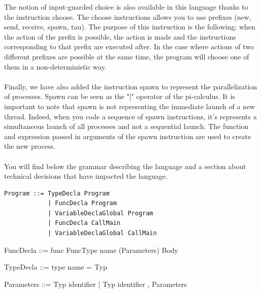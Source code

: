 \documentclass[11pt]{report}
\begin{document}
\tabto{1cm}The notion of input-guarded choice is also available in this language thanks to the instruction choose. The choose instructions allows you to use prefixes (new, send, receive, spawn, tau). The purpose of this instruction is the following: when the action of the prefix is possible, the action is made and the instructions corresponding to that prefix are executed after. In the case where actions of two different prefixes are possible at the same time, the program will choose one of them in a non-deterministic way.
\\ \\
\tabto{1cm} Finally, we have also added the instruction spawn to represent the parallelization of processes. Spawn can be seen as the "|" operator of the pi-calculus. It is important to note that spawn is not representing the immediate launch of a new thread. Indeed, when you code a sequence of spawn instructions, it's represents a simultaneous launch of all processes and not a sequential launch. The function and expression passed in arguments of the spawn instruction are used to create the new process.
\\ \\
\tabto{1cm} You will find below the grammar describing the language and a section about technical decisions that have impacted the language.

\newpage
{}
{} 
\vspace*{20 pt}
\vspace*{3pt}
\begin{Verbatim}[fontfamily=textsf]
Program ::= TypeDecla Program
            | FuncDecla Program
            | VariableDeclaGlobal Program
            | FuncDecla CallMain
            | VariableDeclaGlobal CallMain
\end{Verbatim}
\vspace*{3pt}

\begin{verbnobox}[\normalfont]
FuncDecla ::= func FuncType name (Parameters) Body
\end{verbnobox}
\vspace*{3pt}

\begin{verbnobox}[\normalfont]
TypeDecla ::= type name = Typ
\end{verbnobox}
\vspace*{3pt}

\begin{verbnobox}[\normalfont]
Parameters ::= Typ identifier | Typ identifier , Parameters
\end{verbnobox}
\vspace*{3pt}
\end{document}
